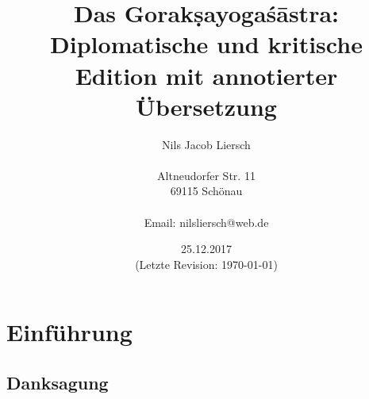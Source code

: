 \documentclass[a4paper,12pt]{article}
\title{Das Gorakṣayogaśāstra: Diplomatische und kritische Edition mit annotierter Übersetzung}
\author{Nils Jacob Liersch\\
\\
Altneudorfer Str. 11\\
69115 Schönau\\
\\
Email: nilsliersch@web.de\\
}
\date{25.12.2017\\
  (Letzte Revision: \today)}
\begin{document}


{\let\newpage\relax\maketitle}
\addtocounter{page}{-1}
\thispagestyle{empty}
\clearpage
\tableofcontents
\addtocounter{page}{-1}
\thispagestyle{empty}
\clearpage


\section{Einführung}


\subsection{Danksagung}
\end{document}
